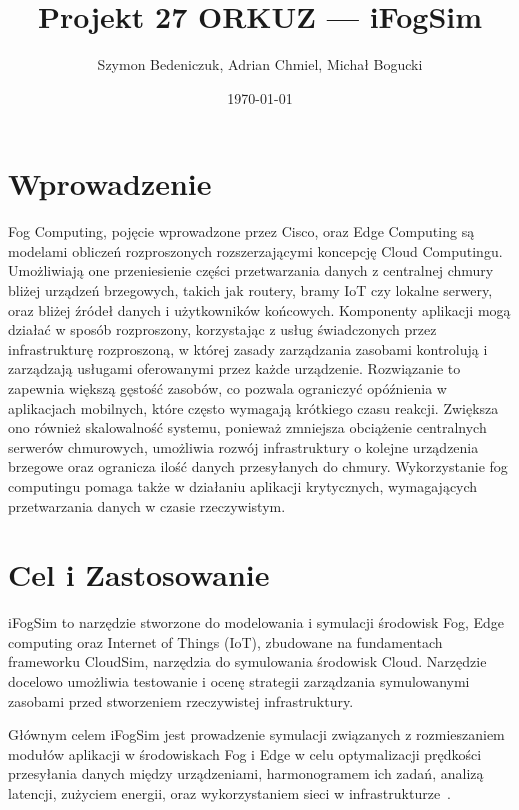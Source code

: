 \documentclass[
    oneside,            %
    left=2.5cm,         %
    right=2.5cm,        %
    top=2.5cm,          %
    bottom=3cm,         %
    bindingoffset=6mm,  %
    nohyphenation=false %
]{eiti/eiti-report}
\begin{document}
\title{
    Projekt 27 ORKUZ --- iFogSim
}

\author{Szymon Bedeniczuk, Adrian Chmiel, Michał Bogucki}
\date{\today}
\maketitle

\newpage

\tableofcontents

\clearpage
\pagestyle{headings}

\section{Wprowadzenie}
Fog Computing, pojęcie wprowadzone przez Cisco, oraz Edge Computing są modelami obliczeń rozproszonych rozszerzającymi koncepcję Cloud Computingu. Umożliwiają one przeniesienie części przetwarzania danych z centralnej chmury bliżej urządzeń brzegowych, takich jak routery, bramy IoT czy lokalne serwery, oraz bliżej źródeł danych i użytkowników końcowych. Komponenty aplikacji mogą działać w sposób rozproszony, korzystając z usług świadczonych przez infrastrukturę rozproszoną, w której zasady zarządzania zasobami kontrolują i zarządzają usługami oferowanymi przez każde urządzenie. 
Rozwiązanie to zapewnia większą gęstość zasobów, co pozwala ograniczyć opóźnienia w aplikacjach mobilnych, które często wymagają krótkiego czasu reakcji. Zwiększa ono również skalowalność systemu, ponieważ zmniejsza obciążenie centralnych serwerów chmurowych, umożliwia rozwój infrastruktury o kolejne urządzenia brzegowe oraz ogranicza ilość danych przesyłanych do chmury. Wykorzystanie fog computingu pomaga także w działaniu aplikacji krytycznych, wymagających przetwarzania danych w czasie rzeczywistym.

\section{Cel i Zastosowanie}
iFogSim to narzędzie stworzone do modelowania i symulacji środowisk Fog, Edge computing oraz Internet of Things (IoT), zbudowane na fundamentach frameworku CloudSim, narzędzia do symulowania środowisk Cloud. Narzędzie docelowo umożliwia testowanie i ocenę strategii zarządzania symulowanymi zasobami przed stworzeniem rzeczywistej infrastruktury.

Głównym celem iFogSim jest prowadzenie symulacji związanych z rozmieszaniem modułów aplikacji w środowiskach Fog i Edge w celu optymalizacji prędkości przesyłania danych między urządzeniami, harmonogramem ich zadań, analizą latencji, zużyciem energii, oraz wykorzystaniem sieci w infrastrukturze~\cite{iFogSimTut}.
\end{document}
